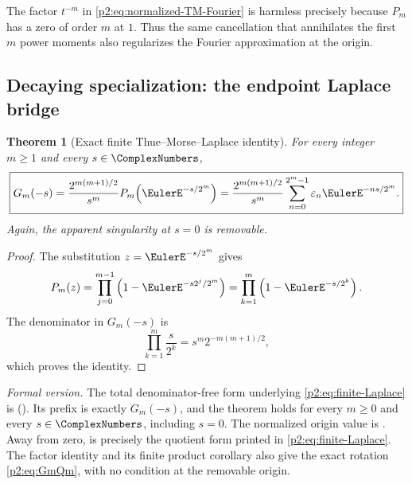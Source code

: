 \documentclass[11pt,oneside]{article}
\numberwithin{equation}{section}
\newtheorem{theorem}{Theorem}[section]
\theoremstyle{definition}
\theoremstyle{remark}
\newcommand{\eps}{\varepsilon}
\begin{document}
\begin{remark}
The factor $t^{-m}$ in \eqref{p2:eq:normalized-TM-Fourier} is harmless precisely because
$P_m$ has a zero of order $m$ at $1$.  Thus the same cancellation that annihilates the first
$m$ power moments also regularizes the Fourier approximation at the origin.
\end{remark}

\subsection{Decaying specialization: the endpoint Laplace bridge}

\begin{theorem}[Exact finite Thue--Morse--Laplace identity]
\label{p2:thm:finite-Laplace}
For every integer $m\ge1$ and every $s\in\ComplexNumbers$,
\begin{equation}
 \boxed{
 G_m(-s)=\frac{2^{m(m+1)/2}}{s^m}
 P_m\!\left(\EulerE^{-s/2^m}\right)
 =\frac{2^{m(m+1)/2}}{s^m}
  \sum_{n=0}^{2^m-1}\eps_n\EulerE^{-ns/2^m}.}
 \label{p2:eq:finite-Laplace}
\end{equation}
Again, the apparent singularity at $s=0$ is removable.
\newresult
\end{theorem}

\begin{proof}
The substitution $z=\EulerE^{-s/2^m}$ gives
\[
 P_m(z)=\prod_{j=0}^{m-1}\left(1-\EulerE^{-s2^j/2^m}\right)
       =\prod_{k=1}^{m}\left(1-\EulerE^{-s/2^k}\right).
\]
The denominator in $G_m(-s)$ is
\[
 \prod_{k=1}^{m}\frac{s}{2^k}
 =s^m2^{-m(m+1)/2},
\]
which proves the identity.
\end{proof}

\emph{Formal version.}  The total denominator-free form underlying
\eqref{p2:eq:finite-Laplace} is
().  Its prefix
 is exactly $G_m(-s)$, and the theorem
holds for every $m\ge0$ and every $s\in\ComplexNumbers$, including $s=0$.
The normalized origin value is
.  Away from zero,
 is precisely
the quotient form printed in \eqref{p2:eq:finite-Laplace}.  The factor identity
 and its finite
product corollary
also give the exact rotation \eqref{p2:eq:GmQm}, with no condition at the
removable origin.
\end{document}
